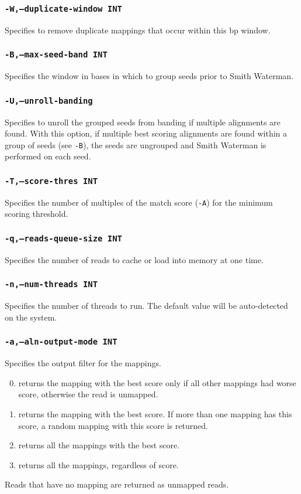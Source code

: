 \documentclass[a4paper,12pt]{book}
\newcommand{\TT}[1]{{\tt #1}} %
\begin{document}
\subsubsection{\TT{-W,--duplicate-window INT}}
Specifies to remove duplicate mappings that occur within this bp window.

\subsubsection{\TT{-B,--max-seed-band INT}}
Specifies the window in bases in which to group seeds prior to Smith Waterman.

\subsubsection{\TT{-U,--unroll-banding}}
Specifies to unroll the grouped seeds from banding if multiple alignments are found.
With this option, if multiple best scoring alignments are found within a group of seeds (see \TT{-B}), the seeds are ungrouped and Smith Waterman is performed on each seed.

\subsubsection{\TT{-T,--score-thres INT}}
Specifies the number of multiples of the match score (\TT{-A}) for the minimum scoring threshold.

\subsubsection{\TT{-q,--reads-queue-size INT}}
Specifies the number of reads to cache or load into memory at one time.

\subsubsection{\TT{-n,--num-threads INT}}
Specifies the number of threads to run.
The default value will be auto-detected on the system.

\subsubsection{\TT{-a,--aln-output-mode INT}}
Specifies the output filter for the mappings.
\begin{enumerate}
	\setcounter{enumi}{-1} %
	\item returns the mapping with the best score only if all other mappings had worse score, otherwise the read is unmapped.
	\item returns the mapping with the best score.  
		If more than one mapping has this score, a random mapping with this score is returned.
	\item returns all the mappings with the best score.
	\item returns all the mappings, regardless of score.
\end{enumerate}
Reads that have no mapping are returned as unmapped reads.
\end{document}
